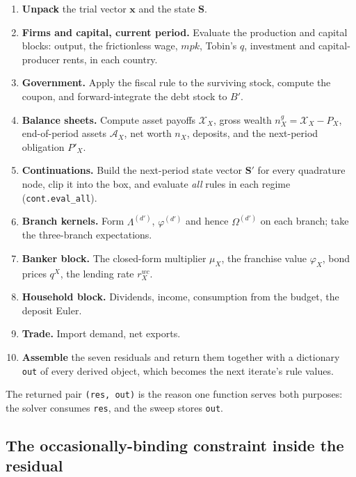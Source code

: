 \documentclass[11pt]{article}
\numberwithin{equation}{section}
\newcommand{\code}[1]{\texttt{\small #1}}
\newcommand{\bx}{\mathbf{x}}
\newcommand{\bS}{\mathbf{S}}
\theoremstyle{definition}
\theoremstyle{plain}
\theoremstyle{remark}
\begin{document}
\begin{enumerate}
\item \textbf{Unpack} the trial vector $\bx$ and the state $\bS$.
\item \textbf{Firms and capital, current period.} Evaluate the production and
      capital blocks: output, the frictionless wage, $mpk$, Tobin's
      $q$, investment and capital-producer rents, in each country.
\item \textbf{Government.} Apply the fiscal rule to the surviving stock, compute the
      coupon, and forward-integrate the debt stock to $B'$.
\item \textbf{Balance sheets.} Compute asset payoffs $\mathcal{X}_X$, gross wealth
      $n^{g}_X=\mathcal{X}_X-P_X$, end-of-period assets $\mathcal{A}_X$, net worth
      $n_X$, deposits, and the next-period obligation $P'_X$.
\item \textbf{Continuations.} Build the next-period state vector
      $\bS'$ for every quadrature node, clip it into the box, and evaluate
      \emph{all} rules in each regime (\code{cont.eval\_all}).
\item \textbf{Branch kernels.} Form $\Lambda^{(d')}$, $\varphi^{(d')}$ and hence
      $\Omega^{(d')}$ on each branch; take the three-branch expectations.
\item \textbf{Banker block.} The closed-form multiplier $\mu_X$, the franchise value
      $\varphi_X$, bond prices $q^{X}$, the lending rate $r^{wc}_X$.
\item \textbf{Household block.} Dividends, income, consumption from the budget, the
      deposit Euler.
\item \textbf{Trade.} Import demand, net exports.
\item \textbf{Assemble} the seven residuals and return them together with a
      dictionary \code{out} of every derived object, which becomes the next iterate's
      rule values.
\end{enumerate}

The returned pair \code{(res, out)} is the reason one function serves both purposes:
the solver consumes \code{res}, and the sweep stores \code{out}.

\subsection{The occasionally-binding constraint inside the residual}
\end{document}
